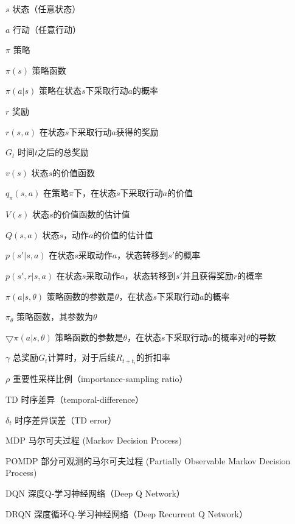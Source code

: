 \begin{denotation}[3cm]
\item[$s$] 状态（任意状态）
\item[$a$] 行动（任意行动）
\item[$\pi$] 策略
\item[$\pi(s)$] 策略函数
\item[$\pi(a|s)$] 策略在状态$s$下采取行动$a$的概率
\item[$r$] 奖励
\item[$r(s, a)$] 在状态$s$下采取行动$a$获得的奖励
\item[$G_t$] 时间$t$之后的总奖励
\item[$v(s)$] 状态$s$的价值函数
\item[$q_\pi(s, a)$] 在策略$\pi$下，在状态$s$下采取行动$a$的价值
\item[$V(s)$] 状态$s$的价值函数的估计值
\item[$Q(s, a)$] 状态$s$，动作$a$的价值的估计值
\item[$p(s'|s, a)$] 在状态$s$采取动作$a$，状态转移到$s'$的概率
\item[$p(s', r|s, a)$] 在状态$s$采取动作$a$，状态转移到$s'$并且获得奖励$r$的概率
\item[$\pi(a|s, \theta)$] 策略函数的参数是$\theta$，在状态$s$下采取行动$a$的概率
\item[$\pi_\theta$] 策略函数，其参数为$\theta$
\item[$\bigtriangledown \pi(a|s, \theta)$] 策略函数的参数是$\theta$，在状态$s$下采取行动$a$的概率对$\theta$的导数
\item[$\gamma$] 总奖励$G_t$计算时，对于后续$R_{t+t_i}$的折扣率
\item[$\rho$] 重要性采样比例（importance-sampling ratio）
\item[TD] 时序差异（temporal-difference）
\item[$\delta_t$] 时序差异误差（TD error）
\item[MDP] 马尔可夫过程 (Markov Decision Process)
\item[POMDP] 部分可观测的马尔可夫过程 (Partially Observable Markov Decision Process)
\item[DQN] 深度Q-学习神经网络（Deep Q Network）
\item[DRQN] 深度循环Q-学习神经网络（Deep Recurrent Q Network）
\end{denotation}
